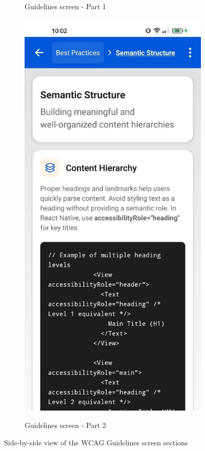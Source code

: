 \begin{figure}[ht]
\begin{subfigure}[b]{0.48\textwidth}
        \caption{Guidelines screen - Part 1}
        \label{fig:guidelines-left}
    \end{subfigure}
    \hfill
    \begin{subfigure}[b]{0.48\textwidth}
        \centering
        \includegraphics[width=\linewidth, alt={Second part of the WCAG Guidelines Screen}]{img/guidelines2.jpg}
        \caption{Guidelines screen - Part 2}
        \label{fig:guidelines-right}
    \end{subfigure}
    \caption{Side-by-side view of the WCAG Guidelines screen sections}
    \label{fig:guidelines_screens_sidebyside}
\end{figure}

